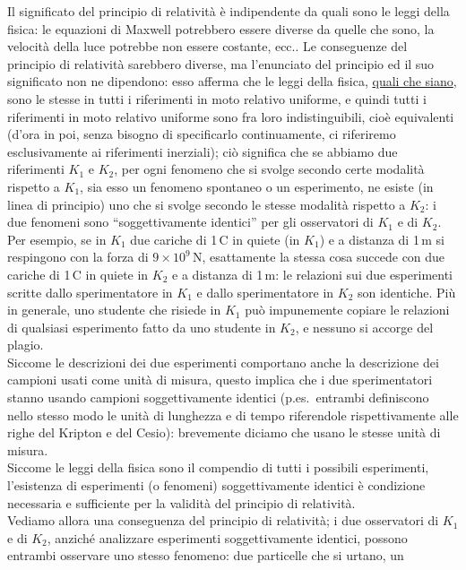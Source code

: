 Il significato del principio di relativit\`a \`e indipendente da quali sono le
leggi della fisica: le equazioni di Maxwell potrebbero essere diverse da quelle
che sono, la velocit\`a della luce potrebbe non essere costante, ecc.. Le
conseguenze del principio di relativit\`a sarebbero diverse, ma l'enunciato del
principio ed il suo significato non ne dipendono: esso afferma che le leggi
della fisica, \underline{quali che siano}, sono le stesse in tutti i riferimenti
in moto relativo uniforme, e quindi tutti i riferimenti in moto relativo
uniforme sono fra loro indistinguibili, cio\`e equivalenti (d'ora in poi, senza
bisogno di specificarlo continuamente, ci riferiremo esclusivamente ai
riferimenti inerziali); ci\`o significa che se abbiamo due riferimenti $K_1$ e
$K_2$, per ogni fenomeno che si svolge secondo certe modalit\`a rispetto a
$K_1$, sia esso un fenomeno spontaneo o un esperimento, ne esiste (in linea di
principio) uno che si svolge secondo le stesse modalit\`a rispetto a $K_2$: i
due fenomeni sono ``soggettivamente identici'' per gli osservatori di $K_1$ e di
$K_2$. Per esempio, se in $K_1$ due cariche di 1\,C in quiete (in $K_1$) e a
distanza di 1\,m si respingono con la forza di $9\times10^9$\,N, esattamente la
stessa cosa succede con due cariche di 1\,C in quiete in $K_2$ e a distanza di
1\,m: le relazioni sui due esperimenti scritte dallo sperimentatore in $K_1$ e
dallo sperimentatore in $K_2$ son identiche. Pi\`u in generale, uno studente che
risiede in $K_1$ pu\`o impunemente copiare le relazioni di qualsiasi esperimento
fatto da uno studente in $K_2$, e nessuno si accorge del plagio.\\
Siccome le descrizioni dei due esperimenti comportano anche la descrizione dei
campioni usati come unit\`a di misura, questo implica che i due sperimentatori
stanno usando campioni soggettivamente identici (p.es.\ entrambi definiscono
nello stesso modo le unit\`a di lunghezza e di tempo riferendole rispettivamente
alle righe del Kripton e del Cesio): brevemente diciamo che usano le stesse
unit\`a di misura.\\
Siccome le leggi della fisica sono il compendio di tutti i possibili
esperimenti, l'esistenza di esperimenti (o fenomeni) soggettivamente identici
\`e condizione necessaria e sufficiente per la validit\`a del principio di
relativit\`a.\\
Vediamo allora una conseguenza del principio di relativit\`a; i due osservatori
di $K_1$ e di $K_2$, anzich\'e analizzare esperimenti soggettivamente identici,
possono entrambi osservare uno stesso fenomeno: due particelle che si urtano, un
